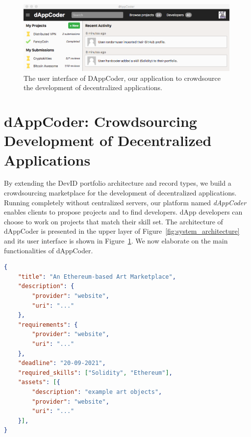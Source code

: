 \begin{figure}[t!]
	\centering
	\includegraphics[width=0.99\textwidth]{devid/resources/gui_smaller.png}
	\caption{The user interface of DAppCoder, our application to crowdsource the development of decentralized applications.}
	\label{fig:dappcoder}
\end{figure}

\section{dAppCoder: Crowdsourcing Development of Decentralized Applications}
\label{sec:dappcoder}
By extending the DevID portfolio architecture and record types, we build a crowdsourcing marketplace for the development of decentralized applications.
Running completely without centralized servers, our platform named \emph{dAppCoder} enables clients to propose projects and to find developers.
dApp developers can choose to work on projects that match their skill set.
The architecture of dAppCoder is presented in the upper layer of Figure~\ref{fig:system_architecture} and its user interface is shown in Figure~\ref{fig:dappcoder}.
We now elaborate on the main functionalities of dAppCoder.

\begin{lstlisting}[language=json,firstnumber=1,float=t,caption=A project offered in DAppCoder (in JSON format).,label=lst:devid_project]
{
	"title": "An Ethereum-based Art Marketplace",
	"description": {
		"provider": "website",
		"uri": "..."
	},
	"requirements": {
		"provider": "website",
		"uri": "..."
	},
	"deadline": "20-09-2021",
	"required_skills": ["Solidity", "Ethereum"],
	"assets": [{
		"description": "example art objects",
		"provider": "website",
		"uri": "..."
	}],
}
\end{lstlisting}

